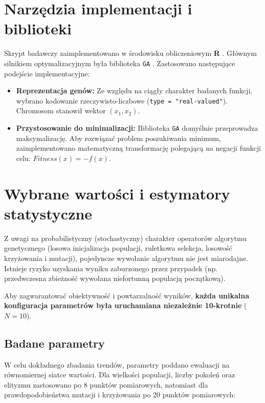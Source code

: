 \documentclass[a4paper,12pt]{article}
\begin{document}
\section{Narzędzia implementacji i biblioteki}
Skrypt badawczy zaimplementowano w środowisku obliczeniowym \textbf{R} \cite{r-manual}. Głównym silnikiem optymalizacyjnym była biblioteka \texttt{GA} \cite{scrucca2013}. Zastosowano następujące podejście implementacyjne:
\begin{itemize}
    \item \textbf{Reprezentacja genów:} Ze względu na ciągły charakter badanych funkcji, wybrano kodowanie rzeczywisto-liczbowe (\texttt{type = "real-valued"}). Chromosom stanowił wektor $(x_1, x_2)$.
    \item \textbf{Przystosowanie do minimalizacji:} Biblioteka \texttt{GA} domyślnie przeprowadza maksymalizację. Aby rozwiązać problem poszukiwania minimum, zaimplementowano matematyczną transformację polegającą na negacji funkcji celu: $Fitness(x) = -f(x)$.
\end{itemize}


\section{Wybrane wartości i estymatory statystyczne}
Z uwagi na probabilistyczny (stochastyczny) charakter operatorów algorytmu genetycznego (losowa inicjalizacja populacji, ruletkowa selekcja, losowość krzyżowania i mutacji), pojedyncze wywołanie algorytmu nie jest miarodajne. Istnieje ryzyko uzyskania wyniku zaburzonego przez przypadek (np. przedwczesna zbieżność wywołana niefortunną populacją początkową).

Aby zagwarantować obiektywność i powtarzalność wyników, \textbf{każda unikalna konfiguracja parametrów była uruchamiana niezależnie 10-krotnie} ($N=10$). 


\subsection{Badane parametry}

W celu dokładnego zbadania trendów, parametry poddano ewaluacji na równomiernej siatce wartości. Dla wielkości populacji, liczby pokoleń oraz elityzmu zastosowano po 8 punktów pomiarowych, natomiast dla prawdopodobieństwa mutacji i krzyżowania po 20 punktów pomiarowych:
\end{document}
